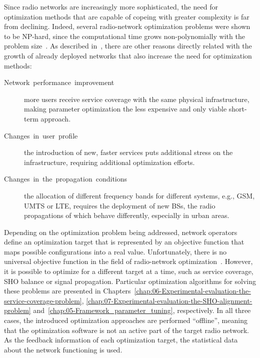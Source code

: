Since radio networks are increasingly more sophisticated, the need
for optimization methods that are capable of copeing with greater
complexity is far from declining. Indeed, several radio-network optimization
problems were shown to be NP-hard, since the computational time grows
non-polynomially with the problem size~\cite{Amaldi-Planning_UMTS_base_station_locations:2003,Amaldi-Radio_planning_and_coverage_optimization_of_3G_networks:2008,Gordejuela-LTE_access_network_planning_and_optimization:2009,Han-Optimizing_cell_size_for_energy_saving_in_cellular_networks:2012,Lee-Proportional_fair_frequency_domain_packet_scheduling_for_LTE_uplink:2009,Razavi-Performance_improvement_of_LTE_tracking_area_design:2008,Siomina-Minimum_pilot_power_for_service_coverage:2007}.
As described in~\cite{Nawrocki-Understanding_UMTS_radio_network_modelling_and_optimisation:2006},
there are other reasons directly related with the growth of already
deployed networks that also increase the need for optimization methods:
\begin{description}
\item [{Network~performance~improvement}] more users receive service
coverage with the same physical infrastructure, making parameter optimization
the less expensive and only viable short-term approach.
\item [{Changes~in~user~profile}] the introduction of new, faster services
puts additional stress on the infrastructure, requiring additional
optimization efforts.
\item [{Changes~in~the~propagation~conditions}] the allocation of different
frequency bands for different systems, e.g., GSM, UMTS or LTE, requires
the deployment of new BSs, the radio propagations of which behave
differently, especially in urban areas.
\end{description}
Depending on the optimization problem being addressed, network operators
define an optimization target that is represented by an objective
function that maps possible configurations into a real value. Unfortunately,
there is no universal objective function in the field of radio-network
optimization~\cite{Nawrocki-Understanding_UMTS_radio_network_modelling_and_optimisation:2006}.
However, it is possible to optimize for a different target at a time,
such as service coverage, SHO balance or signal propagation. Particular
optimization algorithms for solving these problems are presented in
Chapters~\ref{chap:06-Experimental-evaluation-the-service-coverage-problem},
\ref{chap:07-Experimental-evaluation-the-SHO-alignment-problem} and~\ref{chap:05-Framework_parameter_tuning},
respectively. In all three cases, the introduced optimization approaches
are performed ``offline'', meaning that the optimization software
is not an active part of the target radio network. As the feedback
information of each optimization target, the statistical data about
the network functioning is used.

